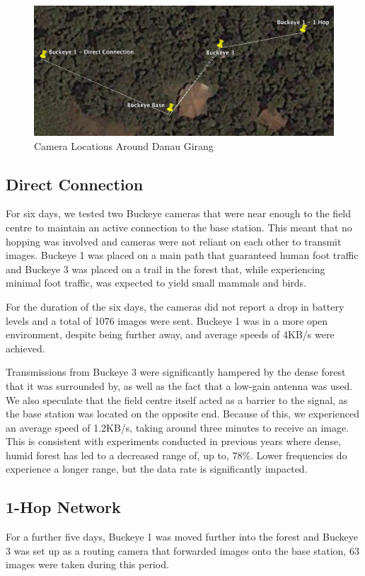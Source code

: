 	    \begin{figure}[h]
	    \centering
		\includegraphics[width=\textwidth]{Chap6/figures/buckeye}
	    \caption{Camera Locations Around Danau Girang}
	    \label{cam_locs}
	    \end{figure}
	
		\subsection{Direct Connection}
		For six days, we tested two Buckeye cameras that were near enough to the field centre to maintain an active connection to the base station. This meant that no hopping was involved and cameras were not reliant on each other to transmit images. Buckeye 1 was placed on a main path that guaranteed human foot traffic and Buckeye 3 was placed on a trail in the forest that, while experiencing minimal foot traffic, was expected to yield small mammals and birds.
		
		For the duration of the six days, the cameras did not report a drop in battery levels and a total of 1076 images were sent. Buckeye 1 was in a more open environment, despite being further away, and average speeds of 4KB/s were achieved. 
		
		Transmissions from Buckeye 3 were significantly hampered by the dense forest that it was surrounded by, as well as the fact that a low-gain antenna was used. We also speculate that the field centre itself acted as a barrier to the signal, as the base station was located on the opposite end. Because of this, we experienced an average speed of 1.2KB/s, taking around three minutes to receive an image. This is consistent with experiments conducted in previous years where dense, humid forest has led to a decreased range of, up to, 78\%. Lower frequencies do experience a longer range, but the data rate is significantly impacted.
		
		\subsection{1-Hop Network}
		For a further five days, Buckeye 1 was moved further into the forest and Buckeye 3 was set up as a routing camera that forwarded images onto the base station, 63 images were taken during this period.
		
